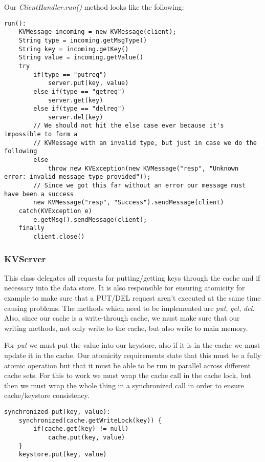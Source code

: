 \documentclass{article}
\begin{document}
Our \textit{ClientHandler.run()} method looks like the following:
\begin{verbatim}
run():
    KVMessage incoming = new KVMessage(client);
    String type = incoming.getMsgType()
    String key = incoming.getKey()
    String value = incoming.getValue()
    try
        if(type == "putreq")
            server.put(key, value)
        else if(type == "getreq")
            server.get(key)
        else if(type == "delreq")
            server.del(key)
        // We should not hit the else case ever because it's impossible to form a
        // KVMessage with an invalid type, but just in case we do the following
        else
            throw new KVException(new KVMessage("resp", "Unknown error: invalid message type provided"));
        // Since we got this far without an error our message must have been a success
        new KVMessage("resp", "Success").sendMessage(client)
    catch(KVException e)
        e.getMsg().sendMessage(client);
    finally
        client.close()
\end{verbatim}

\subsubsection*{KVServer}

This class delegates all requests for putting/getting keys through the cache and if necessary into the data store.
It is also responsible for ensuring atomicity for example to make sure that a PUT/DEL request aren't executed at the
same time causing problems. The methods which need to be implemented are \textit{put}, \textit{get}, \textit{del}. Also,
since our cache is a write-through cache, we must make sure that our writing methods, not only write to the cache, but
also write to main memory.

For \textit{put} we must put the value into our keystore, also if it is in the cache we must update it in the cache. Our
atomicity requirements state that this must be a fully atomic operation but that it must be able to be run in parallel
across different cache sets. For this to work we must wrap the cache call in the cache lock, but then we must wrap the whole
thing in a synchronized call in order to ensure cache/keystore consistency.
\begin{verbatim}
synchronized put(key, value):
    synchronized(cache.getWriteLock(key)) {
        if(cache.get(key) != null)
            cache.put(key, value)
    }
    keystore.put(key, value)
\end{verbatim}
\end{document}
